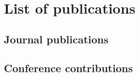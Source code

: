 \chapter{List of publications}

\begin{refsection}[mypublications]
	\nocite{*}

	\section*{Journal publications}
	\printbibliography[heading=none, type=article]

	\section*{Conference contributions}
	\printbibliography[heading=none, type=inproceedings]
\end{refsection}
